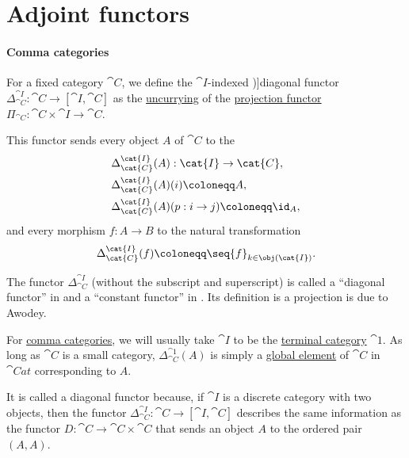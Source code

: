 \section{Adjoint functors}\label{sec:adjoint_functors}

\paragraph{Comma categories}

\begin{definition}\label{def:diagonal_functor}\mimprovised
  For a fixed category \( \cat{C} \), we define the \( \cat{I} \)-indexed \term[en=diagonal functor (\cite[64]{MacLane1998CategoryTheory})]{diagonal functor} \( {\Delta_{\cat{C}}^{\cat{I}}: \cat{C} \to [\cat{I}, \cat{C}]} \) as the \hyperref[con:currying]{uncurrying} of the \hyperref[def:product_category/projection]{projection functor} \( \Pi_{\cat{C}}: \cat{C} \times \cat{I} \to \cat{C} \).

  This functor sends every object \( A \) of \( \cat{C} \) to the 
  \begin{equation*}
    \begin{aligned}
      &\Delta_{\cat{C}}^{\cat{I}}(A): \cat{I} \to \cat{C}, \\
      &\Delta_{\cat{C}}^{\cat{I}}(A)(i) \coloneqq A, \\
      &\Delta_{\cat{C}}^{\cat{I}}(A)(p: i \to j) \coloneqq \id_A,
    \end{aligned}
  \end{equation*}
  and every morphism \( f: A \to B \) to the natural transformation
  \begin{equation*}
    \Delta_{\cat{C}}^{\cat{I}}(f) \coloneqq \seq{ f }_{k \in \obj(\cat{I})}.
  \end{equation*}
\end{definition}
\begin{comments}
  \item The functor \( \Delta_{\cat{C}}^{\cat{I}} \) (without the subscript and superscript) is called a \enquote{diagonal functor} in \cite[64]{MacLane1998CategoryTheory} and a \enquote{constant functor} in \cite[194]{Awodey2010CategoryTheory}. Its definition is a projection is due to Awodey.

  \item For \hyperref[def:comma_category]{comma categories}, we will usually take \( \cat{I} \) to be the \hyperref[def:singleton_category]{terminal category} \( \cat{1} \). As long as \( \cat{C} \) is a small category, \( \Delta_{\cat{C}}^{\cat{1}}(A) \) is simply a \hyperref[def:global_element]{global element} of \( \cat{C} \) in \( \cat{Cat} \) corresponding to \( A \).

  \item It is called a diagonal functor because, if \( \cat{I} \) is a discrete category with two objects, then the functor \( \Delta_{\cat{C}}^{\cat{I}}: \cat{C} \to [\cat{I}, \cat{C}] \) describes the same information as the functor \( D: \cat{C} \to \cat{C} \times \cat{C} \) that sends an object \( A \) to the ordered pair \( (A, A) \).
\end{comments}

